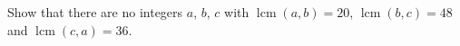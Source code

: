 Show that there are no integers $a$, $b$, $c$ with $\operatorname{lcm}(a,b)=20$, $\operatorname{lcm}(b,c)=48$ and $\operatorname{lcm}(c,a)=36$.
